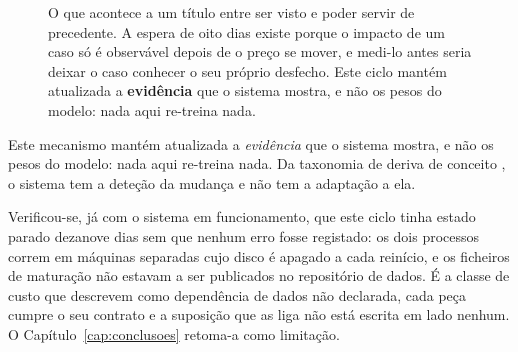 \begin{figure}[ht]
\centering
{}
\caption[O ciclo que faz a base de casos crescer]{O que acontece a um título entre ser visto e
poder servir de precedente. A espera de oito dias existe porque o impacto de um caso só é
observável depois de o preço se mover, e medi-lo antes seria deixar o caso conhecer o seu próprio
desfecho. Este ciclo mantém atualizada a \textbf{evidência} que o sistema mostra, e não os pesos do
modelo: nada aqui re-treina nada.}
\label{fig:sis_ciclo_kb}
\end{figure}

Este mecanismo mantém atualizada a \emph{evidência} que o sistema mostra, e não os pesos do
modelo: nada aqui re-treina nada. Da taxonomia de deriva de conceito \autocite{gama2014survey},
o sistema tem a deteção da mudança e não tem a adaptação a ela.

Verificou-se, já com o sistema em funcionamento, que este ciclo tinha estado parado dezanove dias
sem que nenhum erro fosse registado: os dois processos correm em máquinas separadas cujo disco é
apagado a cada reinício, e os ficheiros de maturação não estavam a ser publicados no repositório de
dados. É a classe de custo que \textcite{sculley2015debt} descrevem como dependência de dados não
declarada, cada peça cumpre o seu contrato e a suposição que as liga não está escrita em lado
nenhum. O Capítulo~\ref{cap:conclusoes} retoma-a como limitação.

